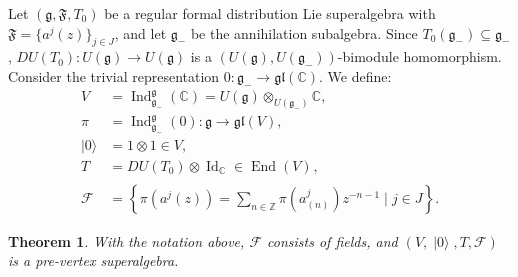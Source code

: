 \documentclass[a4paper, 12pt, reqno]{amsart}
\newtheorem{theorem}{Theorem}[section]
\theoremstyle{remark}
\numberwithin{equation}{subsection}
\DeclareMathOperator{\Id}{Id}
\DeclareMathOperator{\End}{End}
\DeclareMathOperator{\Ind}{Ind}
\DeclareMathOperator{\vac}{|0\rangle}
\DeclareMathOperator{\zero}{\overline{0}}
\begin{document}
Let $(\mathfrak{g}, \mathfrak{F}, T_0)$ be a regular formal distribution Lie superalgebra with $\mathfrak{F} = \{a^j(z)\}_{j \in J}$, and let $\mathfrak{g}_-$ be the annihilation subalgebra.
Since $T_0(\mathfrak{g}_-) \subseteq \mathfrak{g}_-$, $DU(T_0): U(\mathfrak{g}) \to U(\mathfrak{g})$ is a $(U(\mathfrak{g}), U(\mathfrak{g}_-))$-bimodule homomorphism.
Consider the trivial representation $0: \mathfrak{g}_- \to \mathfrak{gl}(\mathbb{C})$.
We define:
\begin{align*}
  V &= \Ind^{\mathfrak{g}}_{\mathfrak{g}_-}(\mathbb{C}) = U(\mathfrak{g}) \otimes_{U(\mathfrak{g}_-)} \mathbb{C}, \\
  \pi &= \Ind^{\mathfrak{g}}_{\mathfrak{g}_-}(0): \mathfrak{g} \to \mathfrak{gl}(V), \\
  \vac &= 1\otimes1 \in V, \\
  T &= DU(T_0)\otimes\Id_{\mathbb{C}} \in \End(V)_{\zero}, \\
  \mathcal{F} &= \left\{\pi(a^j(z)) = \sum_{n \in \mathbb{Z}}\pi(a^j_{(n)})z^{-n - 1} \mid j \in J\right\}.
\end{align*}

\begin{theorem}
  \label{thr:19}
  With the notation above, $\mathcal{F}$ consists of fields, and $(V, \vac, T, \mathcal{F})$ is a pre-vertex superalgebra.
\end{theorem}
\end{document}
